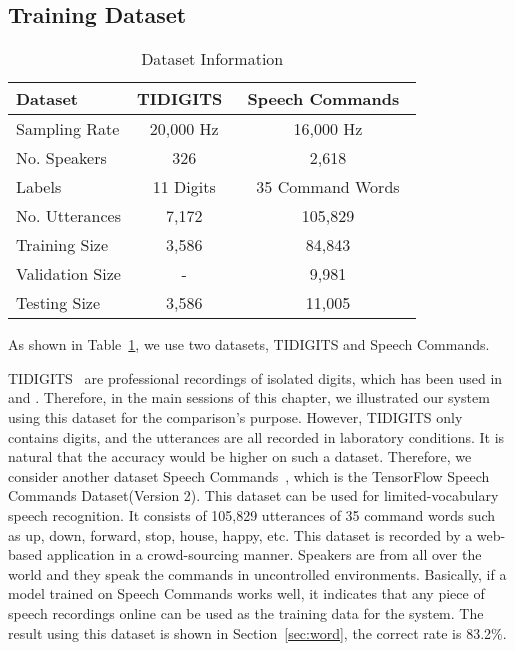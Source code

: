 \subsection{Training Dataset}

\begin{table}[h]
	\caption{Dataset Information}
	\label{tab:dataset}
	\centering
	\begin{tabular}{lcc} %
		\toprule		
		Dataset & TIDIGITS~\cite{leonard1993tidigits} & Speech Commands~\cite{warden2018speech}\\
		\midrule
		Sampling Rate & 20,000 Hz & 16,000 Hz\\
		No. Speakers & 326 & 2,618\\
		Labels & 11 Digits & 35 Command Words \\
		No. Utterances & 7,172& 105,829\\
		Training Size & 3,586 & 84,843\\
		Validation Size & - & 9,981\\
		Testing Size & 3,586 & 11,005\\
		\bottomrule
	\end{tabular}
\end{table}

As shown in Table~\ref{tab:dataset}, we use two datasets, TIDIGITS and Speech Commands. 

TIDIGITS~\cite{leonard1993tidigits} are professional recordings of isolated digits, which has been used in~\cite{michalevsky2014gyrophone} and \cite{anand2019spearphone}. Therefore, in the main sessions of this chapter, we illustrated our system using this dataset for the comparison's purpose. However, TIDIGITS only contains digits, and the utterances are all recorded in laboratory conditions. It is natural that the accuracy would be higher on such a dataset. Therefore, we consider another dataset Speech Commands~\cite{warden2018speech}, which is the TensorFlow Speech Commands Dataset(Version 2). This dataset can be used for limited-vocabulary speech recognition. It consists of 105,829 utterances of 35 command words such as up, down, forward, stop, house, happy, etc. This dataset is recorded by a web-based application in a crowd-sourcing manner. Speakers are from all over the world and they speak the commands in uncontrolled environments. Basically, if a model trained on Speech Commands works well, it indicates that any piece of speech recordings online can be used as the training data for the {\systemName} system. The result using this dataset is shown in Section~\ref{sec:word}, the correct rate is 83.2\%.




